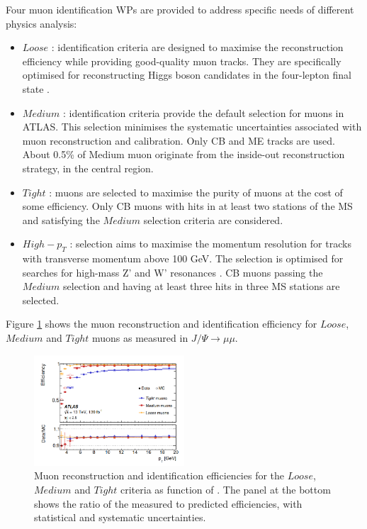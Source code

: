 Four muon identification WPs are provided to address specific needs of different physics analysis:
\begin{itemize}
    \item $Loose$ : identification criteria are designed to maximise the reconstruction efficiency while providing good-quality muon tracks. They are specifically optimised for reconstructing Higgs boson candidates in the four-lepton final state \cite{Higgs_4leptons}.
    \item $Medium$ : identification criteria provide the default selection for muons in ATLAS. This selection minimises the systematic uncertainties associated with muon reconstruction and calibration. Only CB and ME tracks are used. About 0.5\% of Medium muon originate from the inside-out reconstruction strategy, in the central region. 
    \item $Tight$ : muons are selected to maximise the purity of muons at the cost of some efficiency. Only CB muons with hits in at least two stations of the MS and satisfying the $Medium$ selection criteria are considered.
    \item $High-p_T$ : selection  aims  to  maximise the momentum resolution  for  tracks  with transverse momentum above  100 GeV. The  selection is optimised  for  searches  for  high-mass Z' and W' resonances \cite{W,dilepton}. CB muons passing the $Medium$ selection  and having at least three hits in three MS stations are selected.
\end{itemize}
Figure \ref{fig:chap2:Objects:Muon:ID:Eff} shows the muon reconstruction and identification efficiency for $Loose$, $Medium$ and $Tight$ muons as measured in $J/\Psi\rightarrow\mu\mu$. 
\begin{figure}[H]
    \centering
    \includegraphics[width=0.5\textwidth]{Ch2/Img/Muon_ID_Eff.png}
    \caption{Muon reconstruction and identification efficiencies for the $Loose$, $Medium$ and $Tight$ criteria as function of \pT. The panel at the bottom shows the ratio of the measured to predicted efficiencies, with statistical and systematic uncertainties.}
    \label{fig:chap2:Objects:Muon:ID:Eff}
\end{figure}

